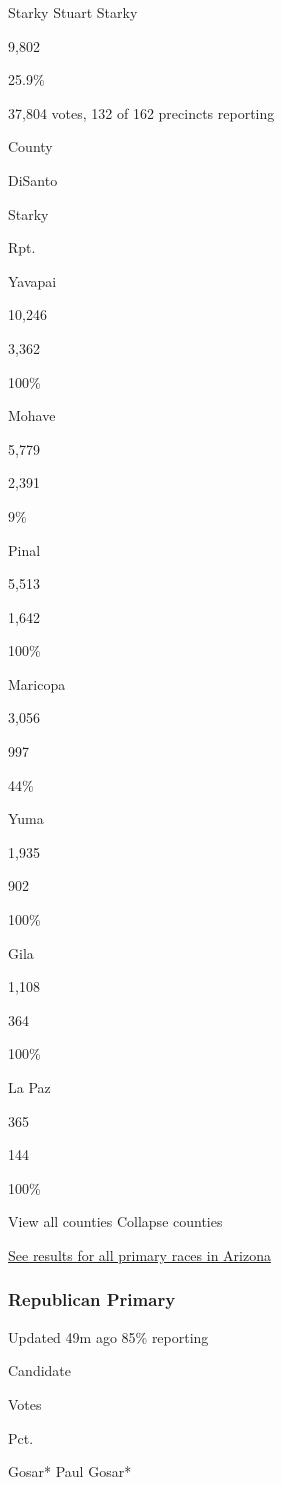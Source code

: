  Starky Stuart Starky

9,802

25.9\%

37,804 votes, 132 of 162 precincts reporting

County

DiSanto

Starky

Rpt.

Yavapai

10,246

3,362

100\%

Mohave

5,779

2,391

9\%

Pinal

5,513

1,642

100\%

Maricopa

3,056

997

44\%

Yuma

1,935

902

100\%

Gila

1,108

364

100\%

La Paz

365

144

100\%

View all counties Collapse counties

\href{https://www.nytimes3xbfgragh.onion/interactive/2020/08/04/us/elections/results-arizona-primary-elections.html}{See
results for all primary races in Arizona}

\hypertarget{republican-primary}{%
\subsubsection{Republican Primary}\label{republican-primary}}

Updated 49m ago 85\% reporting

Candidate

Votes

Pct.

 Gosar* Paul Gosar*

